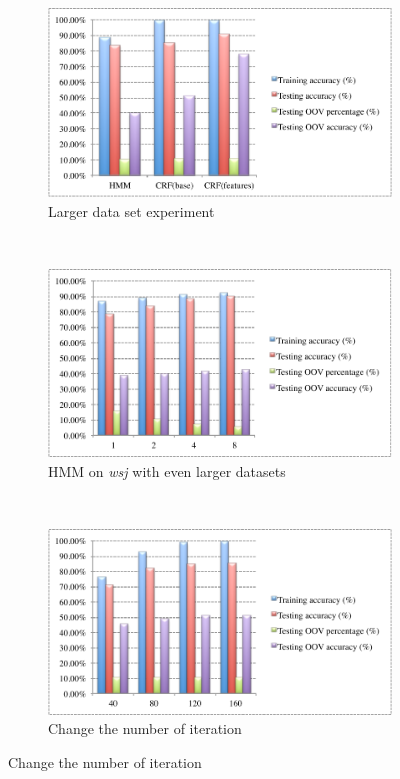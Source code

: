 \documentclass[winfonts,UTF8]{article}
\begin{document}
\begin{enumerate}
\begin{figure}[h]
\begin{subfigure}[b]{0.45\textwidth}
\includegraphics[width=\textwidth]{res5.pdf}
\caption{Larger data set experiment}
\label{fig:res_ext1}
\end{subfigure}
~
\begin{subfigure}[b]{0.45\textwidth}
\includegraphics[width=\textwidth]{res6.pdf}
\caption{HMM on \emph{wsj} with even larger datasets}
\label{fig:res_ext2}
\end{subfigure}
~
\begin{subfigure}[b]{0.45\textwidth}
\includegraphics[width=\textwidth]{res7.pdf}
\caption{Change the number of iteration}
\label{fig:res_ext3}
\end{subfigure}



\end{figure}
\end{enumerate}
\end{document}
